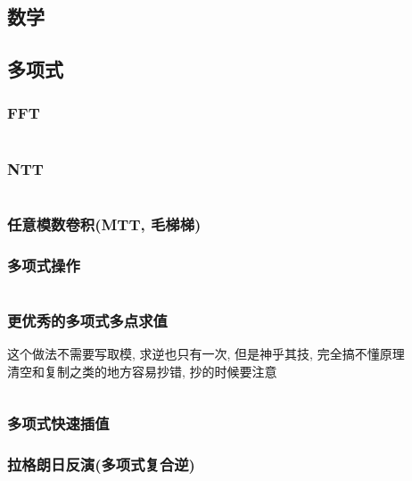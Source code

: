 \documentclass[a4paper, twoside]{article}
\begin{document}
	\begin{multicols}{2}
		\section{数学}
			
			\subsection{多项式}
				\subsubsection{FFT}
					\inputminted{cpp}{../src/math/FFT.cpp}

				\subsubsection{NTT}
					\inputminted{cpp}{../src/math/NTT.cpp}

				\subsubsection{任意模数卷积(MTT, 毛梯梯)}
					
			
				\subsubsection{多项式操作}
					\inputminted{cpp}{../src/math/多项式操作.cpp}

				\subsubsection{更优秀的多项式多点求值}
					这个做法不需要写取模, 求逆也只有一次, 但是神乎其技, 完全搞不懂原理 \\
					清空和复制之类的地方容易抄错, 抄的时候要注意
					\inputminted{cpp}{../src/math/更优秀的多项式多点求值.cpp}

				\subsubsection{多项式快速插值}
					



				\subsubsection{拉格朗日反演(多项式复合逆)}
					


\end{multicols}
\end{document}
